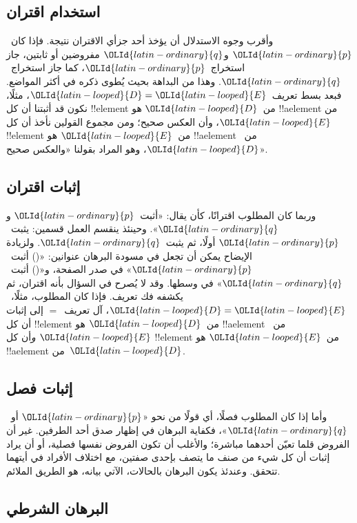 \documentclass[../../../include/open-logic-section]{subfiles}
\begin{document}
\subsection{استخدام اقتران}

وأقرب وجوه الاستدلال أن يؤخذ أحد جزأي الاقتران نتيجة. فإذا كان~${\OLId{latin-ordinary}{p}}$
و${\OLId{latin-ordinary}{q}}$ مفروضين أو ثابتين، جاز استخراج~${\OLId{latin-ordinary}{p}}$، كما جاز استخراج~${\OLId{latin-ordinary}{q}}$. وهذا
من البداهة بحيث يُطوى ذكره في أكثر المواضع. فبعد بسط تعريف~${\OLId{latin-looped}{D}} = {\OLId{latin-looped}{E}}$،
مثلًا، نكون قد أثبتنا أن كل !!{element} من~${\OLId{latin-looped}{D}}$ هو !!a{element} من
${\OLId{latin-looped}{E}}$، وأن العكس صحيح؛ ومن مجموع القولين نأخذ أن كل !!{element} من~${\OLId{latin-looped}{E}}$
هو !!a{element} من~${\OLId{latin-looped}{D}}$، وهو المراد بقولنا «والعكس صحيح».

\subsection{إثبات اقتران}

وربما كان المطلوب اقترانًا، كأن يقال: «أثبت~${\OLId{latin-ordinary}{p}}$ و${\OLId{latin-ordinary}{q}}$». وحينئذ ينقسم
العمل قسمين: يثبت~${\OLId{latin-ordinary}{p}}$ أولًا، ثم يثبت~${\OLId{latin-ordinary}{q}}$. ولزيادة الإيضاح يمكن أن
تجعل في مسودة البرهان عنوانين: «() أثبت~${\OLId{latin-ordinary}{p}}$» في صدر الصفحة، و«()
أثبت~${\OLId{latin-ordinary}{q}}$» في وسطها. وقد لا يُصرح في السؤال بأنه اقتران، ثم يكشفه فك
تعريف. فإذا كان المطلوب، مثلًا،~${\OLId{latin-looped}{D}} = {\OLId{latin-looped}{E}}$، آل تعريف~$=$ إلى إثبات أن
كل !!{element} من~${\OLId{latin-looped}{D}}$ هو !!a{element} من~${\OLId{latin-looped}{E}}$ \emph{و}أن كل
!!{element} من~${\OLId{latin-looped}{E}}$ هو !!a{element} من~${\OLId{latin-looped}{D}}$.

\subsection{إثبات فصل}

وأما إذا كان المطلوب فصلًا، أي قولًا من نحو «${\OLId{latin-ordinary}{p}}$ أو~${\OLId{latin-ordinary}{q}}$»، فكفاية
البرهان في إظهار صدق أحد الطرفين. غير أن الفروض قلما تعيّن أحدهما
مباشرة؛ والأغلب أن تكون الفروض نفسها فصلية، أو أن يراد إثبات أن كل
شيء من صنف ما يتصف بإحدى صفتين، مع اختلاف الأفراد في أيتهما تتحقق.
وعندئذ يكون البرهان بالحالات، الآتي بيانه، هو الطريق الملائم.

\subsection{البرهان الشرطي}
\end{document}
